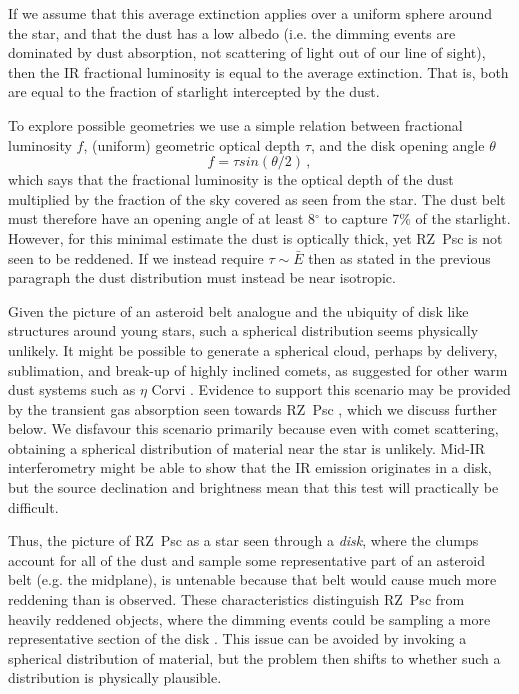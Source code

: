 \documentclass[useAMS,usenatbib,usegraphicx]{mn2e}
\begin{document}
If we assume that this average extinction applies over a uniform sphere around the star,
and that the dust has a low albedo (i.e. the dimming events are dominated by dust
absorption, not scattering of light out of our line of sight), then the IR fractional
luminosity is equal to the average extinction. That is, both are equal to the fraction of
starlight intercepted by the dust.

To explore possible geometries we use a simple relation between fractional luminosity
$f$, (uniform) geometric optical depth $\tau$, and the disk opening angle $\theta$
\citep{2014MNRAS.tmp...88K}
\begin{equation}
  f = \tau sin(\theta/2) \, ,
\end{equation}
which says that the fractional luminosity is the optical depth of the dust multiplied by
the fraction of the sky covered as seen from the star. The dust belt must therefore have
an opening angle of at least 8$^\circ$ to capture 7\% of the starlight. However, for this
minimal estimate the dust is optically thick, yet RZ~Psc is not seen to be reddened. If
we instead require $\tau \sim \bar{E}$ then as stated in the previous paragraph the dust
distribution must instead be near isotropic.

Given the picture of an asteroid belt analogue and the ubiquity of disk like structures
around young stars, such a spherical distribution seems physically unlikely. It might be
possible to generate a spherical cloud, perhaps by delivery, sublimation, and break-up of
highly inclined comets, as suggested for other warm dust systems such as $\eta$ Corvi
\citep{2007ApJ...658..569W,2012ApJ...747...93L}. Evidence to support this scenario may be
provided by the transient gas absorption seen towards RZ~Psc \citep{2013Ap.....56..453P},
which we discuss further below. We disfavour this scenario primarily because even with
comet scattering, obtaining a spherical distribution of material near the star is
unlikely. Mid-IR interferometry might be able to show that the IR emission originates in
a disk, but the source declination and brightness mean that this test will practically be
difficult.

Thus, the picture of RZ~Psc as a star seen through a \emph{disk}, where the clumps
account for all of the dust and sample some representative part of an asteroid belt
(e.g. the midplane), is untenable because that belt would cause much more reddening than
is observed. These characteristics distinguish RZ~Psc from heavily reddened objects,
where the dimming events could be sampling a more representative section of the disk
\citep[e.g.][]{2015MNRAS.451...26S}. This issue can be avoided by invoking a spherical
distribution of material, but the problem then shifts to whether such a distribution is
physically plausible.
\end{document}
